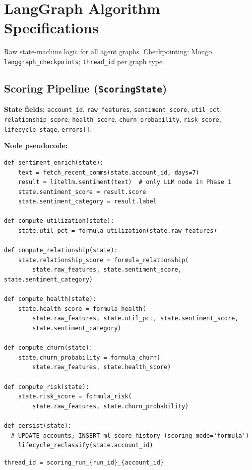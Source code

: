 \documentclass[11pt,a4paper]{article}
\begin{document}
\section{LangGraph Algorithm Specifications}

Raw state-machine logic for all agent graphs. Checkpointing: Mongo \texttt{langgraph\_checkpoints}; \texttt{thread\_id} per graph type.

\subsection{Scoring Pipeline (\texttt{ScoringState})}

\textbf{State fields:} \texttt{account\_id}, \texttt{raw\_features}, \texttt{sentiment\_score}, \texttt{util\_pct}, \texttt{relationship\_score}, \texttt{health\_score}, \texttt{churn\_probability}, \texttt{risk\_score}, \texttt{lifecycle\_stage}, \texttt{errors[]}.

\textbf{Node pseudocode:}
\begin{lstlisting}
def sentiment_enrich(state):
    text = fetch_recent_comms(state.account_id, days=7)
    result = litellm.sentiment(text)  # only LLM node in Phase 1
    state.sentiment_score = result.score
    state.sentiment_category = result.label

def compute_utilization(state):
    state.util_pct = formula_utilization(state.raw_features)

def compute_relationship(state):
    state.relationship_score = formula_relationship(
        state.raw_features, state.sentiment_score, state.sentiment_category)

def compute_health(state):
    state.health_score = formula_health(
        state.raw_features, state.util_pct, state.sentiment_score,
        state.sentiment_category)

def compute_churn(state):
    state.churn_probability = formula_churn(
        state.raw_features, state.health_score)

def compute_risk(state):
    state.risk_score = formula_risk(
        state.raw_features, state.churn_probability)

def persist(state):
  # UPDATE accounts; INSERT ml_score_history (scoring_mode='formula')
    lifecycle_reclassify(state.account_id)
\end{lstlisting}

\texttt{thread\_id = scoring\_run\_\{run\_id\}\_\{account\_id\}}
\end{document}
